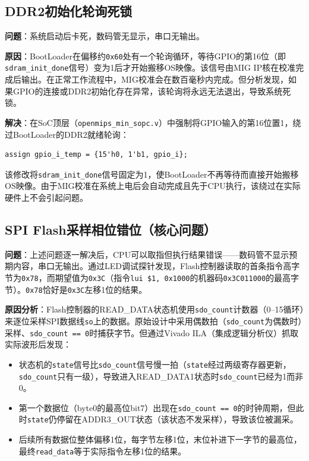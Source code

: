 \subsection{DDR2初始化轮询死锁}

\textbf{问题}：系统启动后卡死，数码管无显示，串口无输出。

\textbf{原因}：BootLoader在偏移约\texttt{0x60}处有一个轮询循环，等待GPIO的第16位（即\texttt{sdram\_init\_done}信号）变为1后才开始搬移OS映像。该信号由MIG IP核在校准完成后输出。在正常工作流程中，MIG校准会在数百毫秒内完成。但分析发现，如果GPIO的连接或DDR2初始化存在异常，该轮询将永远无法退出，导致系统死锁。

\textbf{解决}：在SoC顶层（\texttt{openmips\_min\_sopc.v}）中强制将GPIO输入的第16位置1，绕过BootLoader的DDR2就绪轮询：
\begin{lstlisting}[caption={强制绕过DDR2轮询}]
assign gpio_i_temp = {15'h0, 1'b1, gpio_i};
\end{lstlisting}
该修改将\texttt{sdram\_init\_done}信号固定为1，使BootLoader不再等待而直接开始搬移OS映像。由于MIG校准在系统上电后会自动完成且先于CPU执行，该绕过在实际硬件上不会引起问题。

\subsection{SPI Flash采样相位错位（核心问题）}

\textbf{问题}：上述问题逐一解决后，CPU可以取指但执行结果错误——数码管不显示预期内容，串口无输出。通过LED调试探针发现，Flash控制器读取的首条指令高字节为\texttt{0x78}，而期望值为\texttt{0x3C}（指令\texttt{lui \$1, 0x1000}的机器码\texttt{0x3C011000}的最高字节）。\texttt{0x78}恰好是\texttt{0x3C}左移1位的结果。

\textbf{原因分析}：Flash控制器的READ\_DATA状态机使用\texttt{sdo\_count}计数器（0--15循环）来逐位采样SPI数据线\texttt{so}上的数据。原始设计中采用偶数拍（\texttt{sdo\_count}为偶数时）采样、\texttt{sdo\_count == 0}时捕获字节。但通过Vivado ILA（集成逻辑分析仪）抓取实际波形后发现：

\begin{itemize}[leftmargin=2em]
    \item 状态机的\texttt{state}信号比\texttt{sdo\_count}信号慢一拍（\texttt{state}经过两级寄存器更新，\texttt{sdo\_count}只有一级），导致进入READ\_DATA1状态时\texttt{sdo\_count}已经为1而非0。
    \item 第一个数据位（byte0的最高位bit7）出现在\texttt{sdo\_count == 0}的时钟周期，但此时\texttt{state}仍停留在ADDR3\_OUT状态（该状态不发采样），导致该位被漏采。
    \item 后续所有数据位整体偏移1位，每字节左移1位，末位补进下一字节的最高位，最终\texttt{read\_data}等于实际指令左移1位的结果。
\end{itemize}

